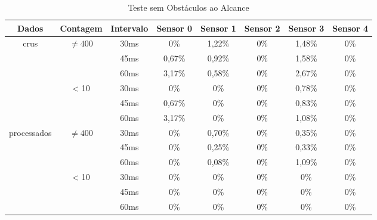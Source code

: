 \begin{table}[H]
\centering
\caption{Teste sem Obstáculos ao Alcance}
\label{vazio}
\begin{tabular}{|c|c|c|ccccc|}\hline
Dados & Contagem & Intervalo & Sensor 0 & Sensor 1 & Sensor 2 & Sensor 3 & Sensor 4 \\ \hline
\multirow{6}{*}{crus} & \multirow{3}{*}{$\neq 400$} & 30ms & 0\% & 1,22\% & 0\% & 1,48\% & 0\% \\
 &  & 45ms & 0,67\% & 0,92\% & 0\% & 1,58\% & 0\% \\
 &  & 60ms & 3,17\% & 0,58\% & 0\% & 2,67\% & 0\% \\ \cline{2-8} 
 & \multirow{3}{*}{\textless \hspace{0,5mm} 10} & 30ms & 0\% & 0\% & 0\% & 0,78\% & 0\% \\
 &  & 45ms & 0,67\% & 0\% & 0\% & 0,83\% & 0\% \\
 &  & 60ms & 3,17\% & 0\% & 0\% & 1,08\% & 0\% \\ \hline
\multirow{6}{*}{processados} & \multirow{3}{*}{$\neq 400$} & 30ms & 0\% & 0,70\% & 0\% & 0,35\% & 0\% \\
 &  & 45ms & 0\% & 0,25\% & 0\% & 0,33\% & 0\% \\
 &  & 60ms & 0\% & 0,08\% & 0\% & 1,09\% & 0\% \\ \cline{2-8} 
 & \multirow{3}{*}{\textless \hspace{0,5mm} 10} & 30ms & 0\% & 0\% & 0\% & 0\% & 0\% \\
 &  & 45ms & 0\% & 0\% & 0\% & 0\% & 0\% \\
 &  & 60ms & 0\% & 0\% & 0\% & 0\% & 0\% \\ \hline
\end{tabular}
\end{table}
